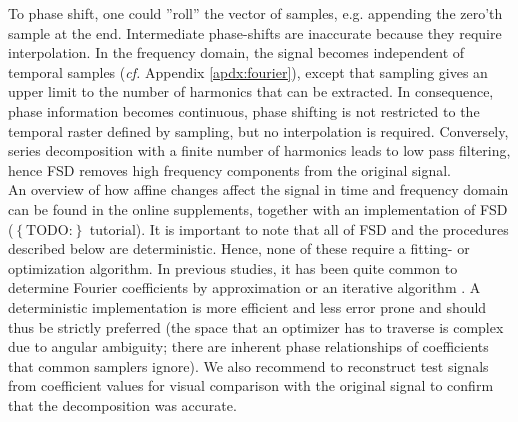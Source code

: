 \documentclass[10pt, a4paper]{article}
\newcommand{\todo}[1]{\colorbox{terracotta!30!yellow}{\footnotesize{$\left\lbrace\text{TODO:}\right\rbrace$ }#1\normalsize}}
\begin{document}
To phase shift, one could ''roll'' the vector of samples, e.g. appending the zero'th sample at the end. 
Intermediate phase-shifts are inaccurate because they require interpolation. 
In the frequency domain, the signal becomes independent of temporal samples (\textit{cf.} Appendix \ref{apdx:fourier}), except that sampling gives an upper limit to the number of harmonics that can be extracted. 
In consequence, phase information becomes continuous, phase shifting is not restricted to the temporal raster defined by sampling, but no interpolation is required. 
Conversely, series decomposition with a finite number of harmonics leads to low pass filtering, hence FSD removes high frequency components from the original signal. 
\\An overview of how affine changes affect the signal in time and frequency domain can be found in the online supplements, together with an implementation of FSD (\todo{tutorial}). 
It is important to note that all of FSD and the procedures described below are deterministic. 
Hence, none of these require a fitting- or optimization algorithm. 
In previous studies, it has been quite common to determine Fourier coefficients by approximation \citep[e.g.][]{Alexander1980} or an iterative algorithm \citep[regression, e.g.][]{Hubel2015}. 
A deterministic implementation is more efficient and less error prone and should thus be strictly preferred (the space that an optimizer has to traverse is complex due to angular ambiguity; there are inherent phase relationships of coefficients that common samplers ignore). 
We also recommend to reconstruct test signals from coefficient values for visual comparison with the original signal to confirm that the decomposition was accurate. 
\end{document}
